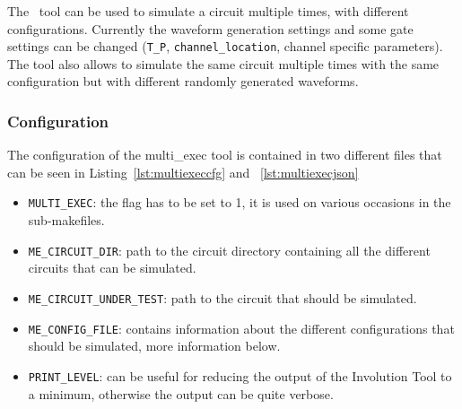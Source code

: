 
The \multiexec\ tool can be used to simulate a circuit multiple
times, with different configurations. Currently the waveform generation
settings and some gate settings can be changed (\lstinline|T_P|, 
\lstinline|channel_location|, channel specific parameters). The tool also 
allows to simulate the same
circuit multiple times with the same configuration but with different
randomly generated waveforms.

\subsubsection{Configuration}\label{sec:man-multi-configuration}

The configuration of the multi\_exec tool is contained in two different
files that can be seen in Listing~\ref{lst:multiexeccfg} and ~\ref{lst:multiexecjson} 


\begin{itemize}
\item
  \lstinline|MULTI_EXEC|: the flag has to be set to 1, it is used on various
  occasions in the sub-makefiles.
\item
  \lstinline|ME_CIRCUIT_DIR|: path to the circuit directory containing all the
  different circuits that can be simulated.
\item
  \lstinline|ME_CIRCUIT_UNDER_TEST|: path to the circuit that should be
  simulated.
\item
  \lstinline|ME_CONFIG_FILE|: contains information about the different
  configurations that should be simulated, more information below.
\item
  \lstinline|PRINT_LEVEL|: can be useful for reducing the output of the 
  Involution
  Tool to a minimum, otherwise the output can be quite verbose.
\end{itemize}


